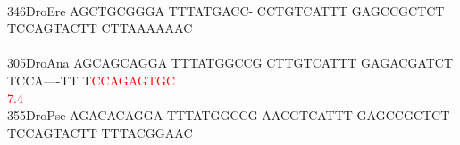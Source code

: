 \documentclass[11pt,twoside,reqno,a4paper]{article}
\begin{document}
{\hspace*{4\charwidth}\hspace*{7\charwidth}\hspace*{1\charwidth}\hspace*{1\charwidth}\hspace*{1\charwidth}\hspace*{1\charwidth}\hspace*{1\charwidth}\hspace*{1\charwidth}\\
346\hspace*{1\charwidth}DroEre	AGCTGCGGGA	TTTATGACC-	CCTGTCATTT	GAGCCGCTCT	TCCAGTACTT	CTTAAAAAAC	\\
\hspace*{4\charwidth}\hspace*{7\charwidth}\hspace*{1\charwidth}\hspace*{1\charwidth}\hspace*{1\charwidth}\hspace*{1\charwidth}\hspace*{1\charwidth}\hspace*{1\charwidth}\\
305\hspace*{1\charwidth}DroAna	AGCAGCAGGA	TTTATGGCCG	CTTGTCATTT	GAGACGATCT	TCCA----TT	T\textcolor{Red}{C}\textcolor{Red}{C}\textcolor{Red}{A}\textcolor{Red}{G}\textcolor{Red}{A}\textcolor{Red}{G}\textcolor{Red}{T}\textcolor{Red}{G}\textcolor{Red}{C}	\\
\hspace*{4\charwidth}\hspace*{7\charwidth}\hspace*{1\charwidth}\hspace*{1\charwidth}\hspace*{1\charwidth}\hspace*{1\charwidth}\hspace*{1\charwidth}\hspace*{51\charwidth}\textcolor{Red}{7.4}\hspace*{1\charwidth}\\
355\hspace*{1\charwidth}DroPse	AGACACAGGA	TTTATGGCCG	AACGTCATTT	GAGCCGCTCT	TCCAGTACTT	TTTACGGAAC	\\
\hspace*{4\charwidth}\hspace*{7\charwidth}\hspace*{1\charwidth}\hspace*{1\charwidth}\hspace*{1\charwidth}\hspace*{1\charwidth}\hspace*{1\charwidth}\hspace*{1\charwidth}\\
}
\end{document}
